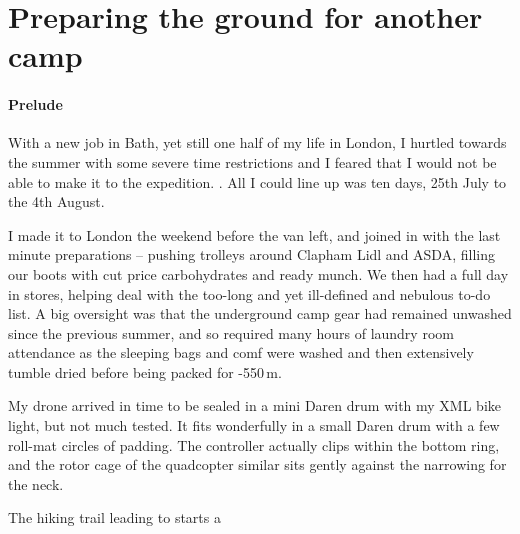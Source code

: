 \section{Preparing the ground for another camp}

\paragraph{Prelude}
With a new job in Bath, yet still one half of my life in London, I hurtled towards the summer with some severe time restrictions and I feared that I would not be able to make it to the expedition. . All I could line up was ten days, 25th July to the 4th August.

I made it to London the weekend before the van left, and joined in with the last minute preparations -- pushing trolleys around Clapham Lidl and ASDA, filling our boots with cut price carbohydrates and ready munch. We then had a full day in stores, helping deal with the too-long and yet ill-defined and nebulous to-do list. A big oversight was that the underground camp gear had remained unwashed since the previous summer, and so required many hours of laundry room attendance as the sleeping bags and comf were washed and then extensively tumble dried before being packed for -550\,m.

My drone  arrived in time to be sealed in a mini Daren drum with my XML bike light, but not much tested. It fits wonderfully in a small Daren drum with a few roll-mat circles of padding. The controller actually clips within the bottom ring, and the rotor cage of the quadcopter similar sits gently against the narrowing for the neck.


\begin{marginfigure}
\checkoddpage \ifoddpage \forcerectofloat \else \forceversofloat \fi
\centering
 \caption{The hiking trail leading to \protect{} starts a \protect{} }
 \label{quadcopter}
\end{marginfigure}


